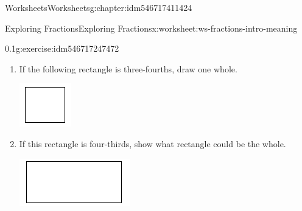 \documentclass[twoside,11pt,]{book}
\begin{document}
\begin{chapterptx}{Worksheets}{}{Worksheets}{}{}{g:chapter:idm546717411424}
\begin{worksheet-section-numberless}{Exploring Fractions}{}{Exploring Fractions}{}{}{x:worksheet:ws-fractions-intro-meaning}
\begin{divisionexercise}{1}{}{0.1}{g:exercise:idm546717247472}
\begin{enumerate}[label=(\alph*)]
\begin{sidebyside}{1}{0.3}{0.3}{0}
\begin{sbspanel}{0.4}
\end{sbspanel}%
\end{sidebyside}%
%
\item{}If the following rectangle is three-fourths, draw one whole. \begin{sidebyside}{1}{0.35}{0.35}{0}%
\begin{sbspanel}{0.3}%
\includegraphics[width=1\linewidth]{images/generic-square.png}
\end{sbspanel}%
\end{sidebyside}%
%
\item{}If this rectangle is four-thirds, show what rectangle could be the whole. \begin{sidebyside}{1}{0.3}{0.3}{0}%
\begin{sbspanel}{0.4}%
\includegraphics[width=1\linewidth]{images/generic-rectangle.png}
\end{sbspanel}%
\end{sidebyside}%
%

\end{enumerate}
\end{divisionexercise}
\end{worksheet-section-numberless}
\end{chapterptx}
\end{document}
